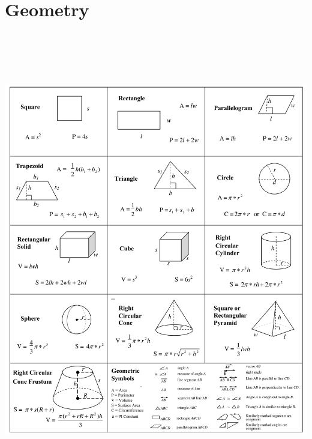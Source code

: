 \documentclass[11pt,letterpaper]{article}
\begin{document}
\newpage

\begin{minipage}{\textwidth}
     \section*{Geometry}
     \begin{center}
          \includegraphics[height = 20cm]{images/geometry.png}
     \end{center}    
\end{minipage}
\end{document}
